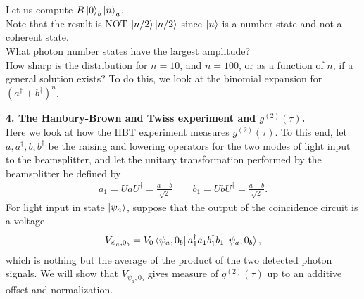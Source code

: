 \documentclass{article}
\theoremstyle{definition}
\newcommand{\f}[2]{\frac{#1}{#2}}
\begin{document}
\begin{enumerate}[label=\alph*)]
Let us compute $B\ket{0}_b\ket{n}_a$. \\


Note that the result is NOT $\ket{n/2}\ket{n/2}$ since $\ket{n}$ is a number state and not a coherent state. \\


What photon number states have the largest amplitude? \\

How sharp is the distribution for $n = 10$, and $n = 100$, or as a function of $n$, if a general solution exists? To do this, we look at the binomial expansion for $(a^\dagger  + b^\dagger)^n$. 

\end{enumerate}


\noindent \textbf{4. The Hanbury-Brown and Twiss experiment and $g^{(2)}(\tau)$.} \\

\noindent Here we look at how the HBT experiment measures $g^{(2)}(\tau)$. To this end, let $a,a^\dagger,b,b^\dagger$ be the raising and lowering operators for the two modes of light input to the beamsplitter, and let the unitary transformation performed by the beamsplitter be defined by 
\begin{align*}
a_1 = U a U^\dagger = \f{a+b}{\sqrt{2}} \quad\quad b_1 = UbU^\dagger = \f{a-b}{\sqrt{2}}.
\end{align*}
For light input in state $\ket{\psi_a}$, suppose that the output of the coincidence circuit is a voltage
\begin{align*}
V_{\psi_a,0_b} = V_0 \bra{\psi_a,  0_b} a_1^\dagger a_1 b_1^\dagger b_1 \ket{\psi_a, 0_b},
\end{align*}
which is nothing but the average of the product of the two detected photon signals. We will show that $V_{\psi_a,0_b}$ gives measure of $g^{(2)}(\tau)$ up to an additive offset and normalization. 
\end{document}
